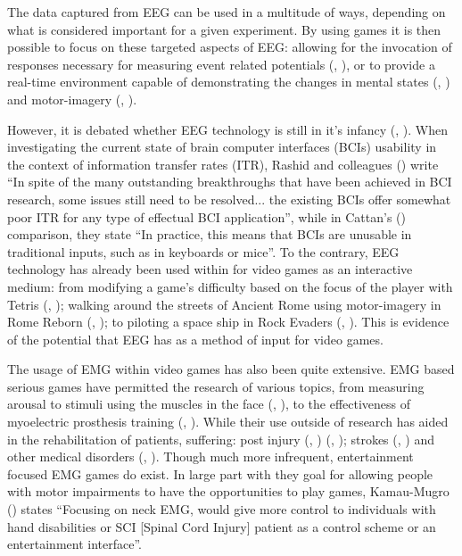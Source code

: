 \documentclass[11pt, a4paper]{article}
\newcommand{\ccite}[1]{(\citeauthor{#1}, \citeyear{#1})}
\newcommand{\cciteyear}[1]{(\citeyear{#1})}
\begin{document}
The data captured from EEG can be used in a multitude of ways, depending on what is considered important for a given experiment. By using games it is then possible to focus on these targeted aspects of EEG: allowing for the invocation of responses necessary for measuring event related potentials \ccite{ahn2011using}, or to provide a real-time environment capable of demonstrating the changes in mental states \ccite{liarokapis2015examining} and motor-imagery \ccite{ndulue2019driving}. 

However, it is debated whether EEG technology is still in it's infancy \ccite{rashid2020current}. When investigating the current state of brain computer interfaces (BCIs) usability in the context of information transfer rates (ITR), Rashid and colleagues \cciteyear{rashid2020current} write ``In spite of the many outstanding breakthroughs that have been achieved in BCI research, some issues still need to be resolved... the existing BCIs offer somewhat poor ITR for any type of effectual BCI application'', while in Cattan's \cciteyear{cattan2021use} comparison, they state ``In practice, this means that BCIs are unusable in traditional inputs, such as in keyboards or mice''. To the contrary, EEG technology has already been used within for video games as an interactive medium: from modifying a game's difficulty based on the focus of the player with Tetris \ccite{liarokapis2015examining}; walking around the streets of Ancient Rome using motor-imagery in Rome Reborn \ccite{ndulue2019driving}; to piloting a space ship in Rock Evaders \ccite{ndulue2019driving}. This is evidence of the potential that EEG has as a method of input for video games.

\hfill

The usage of EMG within video games has also been quite extensive. EMG based serious games have permitted the research of various topics, from measuring arousal to stimuli using the muscles in the face \ccite{schuurink2008engagement}, to the effectiveness of myoelectric prosthesis training \ccite{bessa2020designing}. While their use outside of research has aided in the rehabilitation of patients, suffering: post injury \ccite{gutierrez2020serious} \ccite{schonauer2011full}; strokes \ccite{ghassemi2019development} and other medical disorders \ccite{labruyere2013requirements}. Though much more infrequent, entertainment focused EMG games do exist. In large part with they goal for allowing people with motor impairments to have the opportunities to play games, Kamau-Mugro \cciteyear{muguro2020development} states ``Focusing on neck EMG, would give more control to individuals with hand disabilities or SCI [Spinal Cord Injury] patient as a control scheme or an entertainment interface''.
\end{document}

